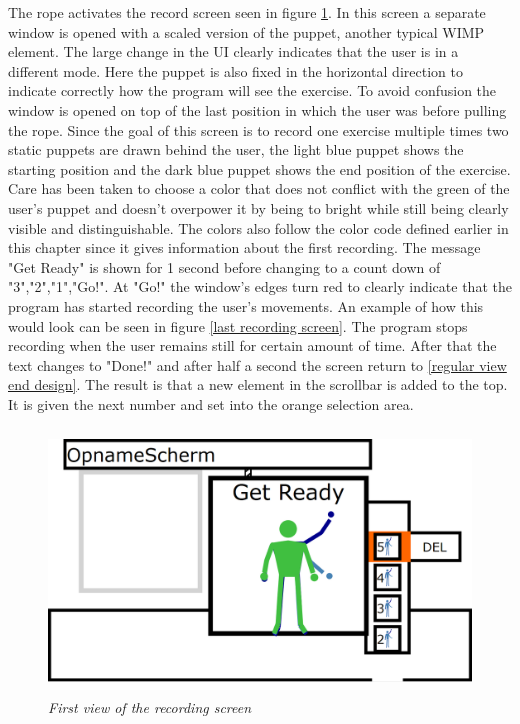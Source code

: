 The rope activates the record screen seen in figure \ref{first recording screen}. In this screen a separate window is opened with a scaled version of the puppet, another typical WIMP element. The large change in the UI clearly indicates that the user is in a different mode. Here the puppet is also fixed in the horizontal direction to indicate correctly how the program will see the exercise. To avoid confusion the window is opened on top of the last position in which the user was before pulling the rope. Since the goal of this screen is to record one exercise multiple times two static puppets are drawn behind the user, the light blue puppet shows the starting position and the dark blue puppet shows the end position of the exercise. Care has been taken to choose a color that does not conflict with the green of the user's puppet and doesn't overpower it by being to bright while still being clearly visible and distinguishable. The colors also follow the color code defined earlier in this chapter since it gives information about the first recording. The message "Get Ready" is shown for 1 second before changing to a count down of "3","2","1","Go!". At "Go!" the window's edges turn red to clearly indicate that the program has started recording the user's movements. An example of how this would look can be seen in figure \ref{last recording screen}. The program stops recording when the user remains still for certain amount of time. After that the text changes to "Done!" and after half a second the screen return to \ref{regular view end design}. The result is that a new element in the scrollbar is added to the top. It is given the next number and set into the orange selection area.\\

\begin{figure}[H]
	\begin{center}
		\includegraphics[width=12.5cm, height=7cm]{figures/4_record_getready.png}
		\caption{\emph{First view of the recording screen}}
		\label{first recording screen}
	\end{center}
\end{figure}

